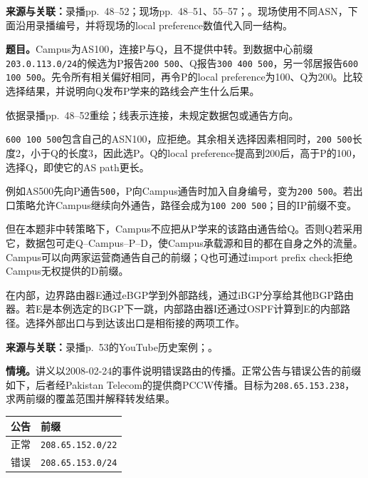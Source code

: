 
\textbf{来源与关联：}录播pp.~48--52；现场pp.~48--51、55--57；。现场使用不同ASN，下面沿用录播编号，并将现场的local preference数值代入同一结构。

\textbf{题目。}Campus为AS100，连接P与Q，且不提供中转。到数据中心前缀\texttt{203.0.113.0/24}的候选为P报告\texttt{200 500}、Q报告\texttt{300 400 500}，另一邻居报告\texttt{600 100 500}。先令所有相关偏好相同，再令P的local preference为100、Q为200。比较选择结果，并说明向Q发布P学来的路线会产生什么后果。

\begin{center}


\small 依据录播pp.~48--52重绘；线表示连接，未规定数据包或通告方向。
\end{center}

\begin{workedsolution}
\texttt{600 100 500}包含自己的ASN100，应拒绝。其余相关选择因素相同时，\texttt{200 500}长度2，小于Q的长度3，因此选P。Q的local preference提高到200后，高于P的100，选择Q，即使它的AS path更长。

例如AS500先向P通告\texttt{500}，P向Campus通告时加入自身编号，变为\texttt{200 500}。若出口策略允许Campus继续向外通告，路径会成为\texttt{100 200 500}；目的IP前缀不变。

但在本题非中转策略下，Campus不应把从P学来的该路由通告给Q。否则Q若采用它，数据包可走Q--Campus--P--D，使Campus承载源和目的都在自身之外的流量。Campus可以向两家运营商通告自己的前缀；Q也可通过import prefix check拒绝Campus无权提供的D前缀。

在内部，边界路由器E通过eBGP学到外部路线，通过iBGP分享给其他BGP路由器。若E是本例选定的BGP下一跳，内部路由器I还通过OSPF计算到E的内部路径。选择外部出口与到达该出口是相衔接的两项工作。
\end{workedsolution}


\textbf{来源与关联：}录播p.~53的YouTube历史案例；。

\textbf{情境。}讲义以2008-02-24的事件说明错误路由的传播。正常公告与错误公告的前缀如下，后者经Pakistan Telecom的提供商PCCW传播。目标为\texttt{208.65.153.238}，求两前缀的覆盖范围并解释转发结果。

\begin{center}
\small
\begin{tabular}{@{}ll@{}}
\toprule
公告 & 前缀 \\
\midrule
正常 & \texttt{208.65.152.0/22} \\
错误 & \texttt{208.65.153.0/24} \\
\bottomrule
\end{tabular}
\end{center}

